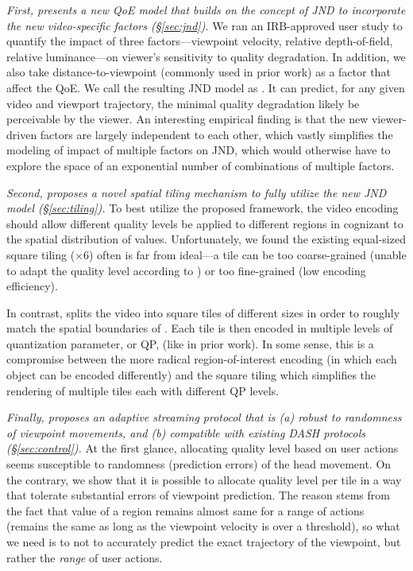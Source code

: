 \vspace{0.1cm}
{\em First, \name presents a new QoE model that builds on the concept of JND to incorporate the new \vr video-specific factors (\S\ref{sec:jnd}).}
We ran an IRB-approved user study to quantify the impact of three factors---viewpoint velocity, relative depth-of-field, relative luminance---on viewer's sensitivity to quality degradation. 
In addition, we also take distance-to-viewpoint (commonly used in prior work) as a factor that affect the QoE.
We call the resulting JND model as {\em \vrjnd}. 
It can predict, for any given video and viewport trajectory, the minimal quality degradation likely be perceivable by the viewer.
An interesting empirical finding is that the new viewer-driven factors are largely independent to each other, which vastly simplifies the modeling of impact of multiple factors on JND, which would otherwise have to explore the space of an exponential number of combinations of multiple factors.


\vspace{0.1cm}
{\em Second, \name proposes a novel spatial tiling mechanism to fully utilize the new JND model (\S\ref{sec:tiling}).}
To best utilize the proposed \vrjnd framework, the video encoding should allow different quality levels be applied to different regions in cognizant to the spatial distribution of \vrjnd values.
Unfortunately, we found the existing equal-sized square tiling ($\times$6) often is far from ideal---a tile can be too coarse-grained (\ie unable to adapt the quality level according to \vrjnd) or too fine-grained (\ie low encoding efficiency).

In contrast, \name splits the \vr video into square tiles of different sizes in order to roughly match the spatial boundaries of \vrjnd. 
Each tile is then encoded in multiple levels of quantization parameter, or QP, (like in prior work).
In some sense, this is a compromise between the more radical region-of-interest encoding (in which each object can be encoded differently) and the square tiling which simplifies the rendering of multiple tiles each with different QP levels.



\vspace{0.1cm}
{\em Finally, \name proposes an adaptive streaming protocol that is (a) robust to randomness of viewpoint movements, and (b) compatible with existing DASH protocols (\S\ref{sec:control}).}
At the first glance, allocating quality level based on user actions seems susceptible to randomness (\ie prediction errors) of the head movement. 
On the contrary, we show that it is possible to allocate quality level per tile in a way that tolerate substantial errors of viewpoint prediction. 
The reason stems from the fact that \vrjnd value of a region remains almost same for a range of actions (\eg \vrjnd remains the same as long as the viewpoint velocity is over a threshold), so what we need is to not to accurately predict the exact trajectory of the viewpoint, but rather the {\em range} of user actions.

